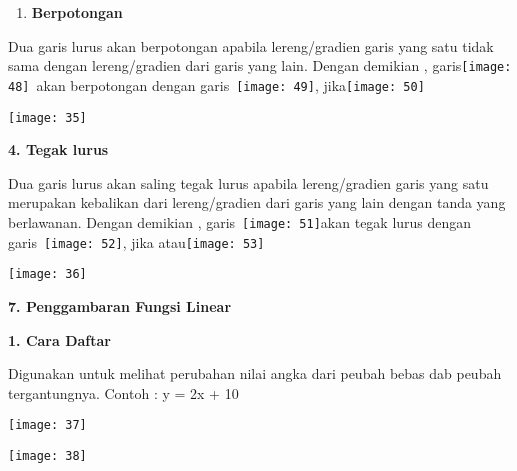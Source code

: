 \documentclass[11pt,fleqn]{book} %
\begin{document}
\begin{myEnumerate}
\begin{itemize}
\noindent 

\begin{enumerate}
\item  \textbf{Berpotongan}
\end{enumerate}

\noindent Dua garis lurus akan berpotongan apabila lereng/gradien garis yang satu tidak sama dengan lereng/gradien dari garis yang lain. Dengan demikian , garis\texttt{[image: 48]}~akan berpotongan dengan garis~\texttt{[image: 49]}, jika\texttt{[image: 50]}

\begin{center}
\noindent \texttt{[image: 35]}
\end{center}

\noindent \textbf{4.   Tegak lurus}

\noindent Dua garis lurus akan saling tegak lurus apabila lereng/gradien garis yang satu merupakan kebalikan dari lereng/gradien dari garis yang lain dengan tanda yang berlawanan. Dengan demikian , garis~\texttt{[image: 51]}akan tegak lurus dengan garis~\texttt{[image: 52]}, jika atau\texttt{[image: 53]}

\begin{center}
\noindent \texttt{[image: 36]}
\end{center}

\noindent 

\noindent \textbf{7.  Penggambaran Fungsi Linear}

\textbf{1. Cara Daftar}

\noindent Digunakan untuk melihat perubahan nilai angka dari peubah bebas dab peubah tergantungnya. Contoh :
\noindent y = 2x + 10
\begin{center}
\noindent \texttt{[image: 37]}
\end{center}

\noindent 

\noindent 

\begin{center}
\noindent \texttt{[image: 38]}
\end{center}


\end{itemize}
\end{myEnumerate}
\end{document}
